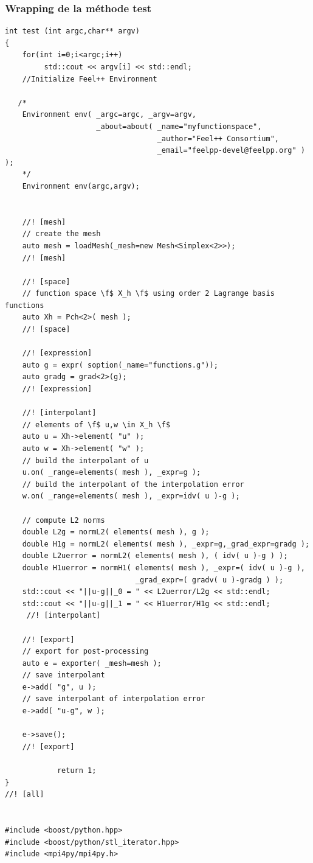 \documentclass[french,12pt]{article}
\begin{document}
\subsubsection{Wrapping de la méthode test}
\begin{lstlisting}
int test (int argc,char** argv)
{
    for(int i=0;i<argc;i++)
         std::cout << argv[i] << std::endl;
    //Initialize Feel++ Environment
   
   /*
    Environment env( _argc=argc, _argv=argv,
                     _about=about( _name="myfunctionspace",
                                   _author="Feel++ Consortium",
                                   _email="feelpp-devel@feelpp.org" )  );
    */
    Environment env(argc,argv);
    

    //! [mesh]
    // create the mesh
    auto mesh = loadMesh(_mesh=new Mesh<Simplex<2>>);
    //! [mesh]

    //! [space]
    // function space \f$ X_h \f$ using order 2 Lagrange basis functions
    auto Xh = Pch<2>( mesh );
    //! [space]

    //! [expression]
    auto g = expr( soption(_name="functions.g"));
    auto gradg = grad<2>(g);
    //! [expression]

    //! [interpolant]
    // elements of \f$ u,w \in X_h \f$
    auto u = Xh->element( "u" );
    auto w = Xh->element( "w" );
    // build the interpolant of u
    u.on( _range=elements( mesh ), _expr=g );
    // build the interpolant of the interpolation error
    w.on( _range=elements( mesh ), _expr=idv( u )-g );

    // compute L2 norms
    double L2g = normL2( elements( mesh ), g );
    double H1g = normL2( elements( mesh ), _expr=g,_grad_expr=gradg );
    double L2uerror = normL2( elements( mesh ), ( idv( u )-g ) );
    double H1uerror = normH1( elements( mesh ), _expr=( idv( u )-g ),
                              _grad_expr=( gradv( u )-gradg ) );
    std::cout << "||u-g||_0 = " << L2uerror/L2g << std::endl;
    std::cout << "||u-g||_1 = " << H1uerror/H1g << std::endl;
     //! [interpolant]

    //! [export]
    // export for post-processing
    auto e = exporter( _mesh=mesh );
    // save interpolant
    e->add( "g", u );
    // save interpolant of interpolation error
    e->add( "u-g", w );

    e->save();
    //! [export]

            return 1;  
}
//! [all]


#include <boost/python.hpp>
#include <boost/python/stl_iterator.hpp>
#include <mpi4py/mpi4py.h>


\end{lstlisting}
\end{document}
